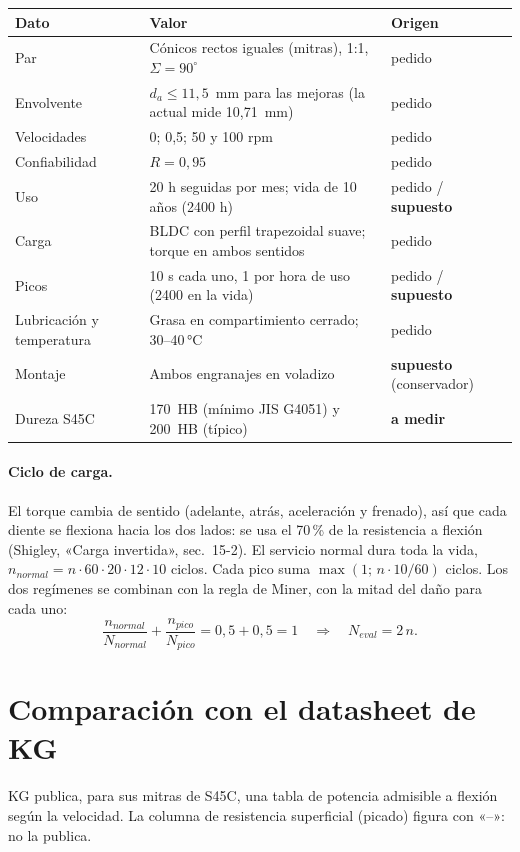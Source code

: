 \documentclass[11pt,a4paper]{article}
\begin{document}
\begin{table}[H]\centering\small
\begin{tabularx}{\linewidth}{l X l}
\toprule
Dato & Valor & Origen\\\midrule
Par & Cónicos rectos iguales (mitras), 1:1, $\Sigma=90^\circ$ & pedido\\
Envolvente & $d_a\le11{,}5$~mm para las mejoras (la actual mide 10,71~mm) & pedido\\
Velocidades & 0; 0,5; 50 y 100 rpm & pedido\\
Confiabilidad & $R=0{,}95$ & pedido\\
Uso & 20 h seguidas por mes; vida de 10 años (2400 h) & pedido / \textbf{supuesto}\\
Carga & BLDC con perfil trapezoidal suave; torque en ambos sentidos & pedido\\
Picos & 10 s cada uno, 1 por hora de uso (2400 en la vida) & pedido / \textbf{supuesto}\\
Lubricación y temperatura & Grasa en compartimiento cerrado; 30--40\,°C & pedido\\
Montaje & Ambos engranajes en voladizo & \textbf{supuesto} (conservador)\\
Dureza S45C & 170~HB (mínimo JIS G4051) y 200~HB (típico) & \textbf{a medir}\\
\bottomrule
\end{tabularx}
\end{table}

\paragraph{Ciclo de carga.}
El torque cambia de sentido (adelante, atrás, aceleración y frenado), así que cada diente se flexiona hacia
los dos lados: se usa el 70\,\% de la resistencia a flexión (Shigley, «Carga invertida», sec.~15-2).
El servicio normal dura toda la vida, $n_{normal}=n\cdot60\cdot20\cdot12\cdot10$ ciclos. Cada pico suma
$\max(1;\,n\cdot10/60)$ ciclos. Los dos regímenes se combinan con la regla de Miner, con la mitad del daño para cada uno:
\begin{equation}
\frac{n_{normal}}{N_{normal}}+\frac{n_{pico}}{N_{pico}}=0{,}5+0{,}5=1
\quad\Rightarrow\quad N_{eval}=2\,n .
\end{equation}

\section{Comparación con el datasheet de KG}\label{sec:datasheet}
KG publica, para sus mitras de S45C, una tabla de potencia admisible a flexión según la velocidad. La columna de
resistencia superficial (picado) figura con «--»: no la publica.
\end{document}
